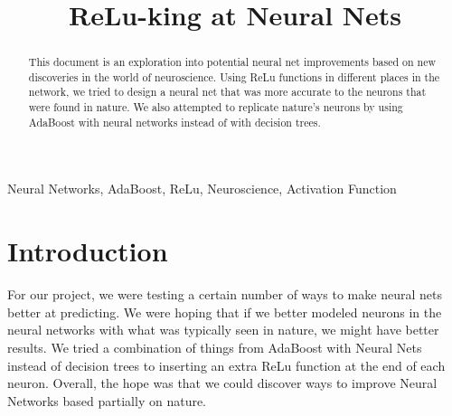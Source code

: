 \documentclass[conference]{IEEEtran}
\begin{document}
\title{ReLu-king at Neural Nets\\
}

\author{
\and
{}
}

\maketitle

\begin{abstract}
This document is an exploration into potential neural net improvements based on new discoveries in the world of neuroscience. Using ReLu functions in different places in the network, we tried to design a neural net that was more accurate to the neurons that were found in nature. We also attempted to replicate nature's neurons by using AdaBoost with neural networks instead of with decision trees.
\end{abstract}

\begin{IEEEkeywords}
Neural Networks, AdaBoost, ReLu, Neuroscience, Activation Function
\end{IEEEkeywords}

\section{Introduction}
For our project, we were testing a certain number of ways to make neural nets better at predicting. We were hoping that if we better modeled neurons in the neural networks with what was typically seen in nature, we might have better results. We tried a combination of things from AdaBoost with Neural Nets instead of decision trees to inserting an extra ReLu function at the end of each neuron. Overall, the hope was that we could discover ways to improve Neural Networks based partially on nature.\newline
\end{document}
